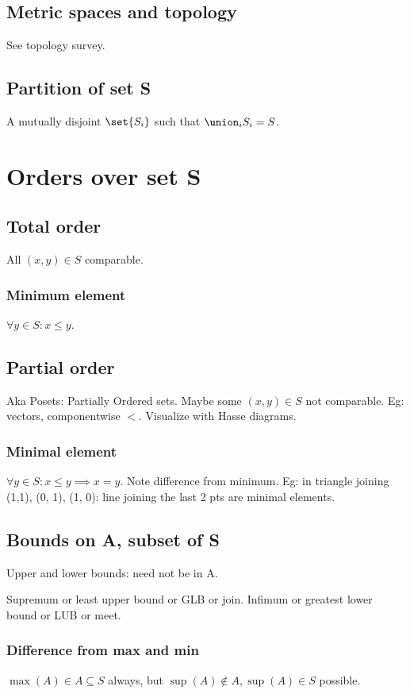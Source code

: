 \documentclass[oneside, article]{memoir}
\begin{document}
\section{Metric spaces and topology}
See topology survey.

\section{Partition of set S}
A mutually disjoint $\set{S_i}$ such that $\union_i S_i = S$.

\chapter{Orders over set S}
\section{Total order}
All $(x, y) \in S$ comparable.

\subsection{Minimum element}
$\forall y \in S: x\leq y$.

\section{Partial order}
Aka Posets: Partially Ordered sets. Maybe some $(x, y) \in S$ not comparable. Eg: vectors, componentwise $<$. Visualize with Hasse diagrams.

\subsection{Minimal element}
$\forall y \in S: x\leq y \implies x = y$. Note difference from minimum. Eg: in triangle joining (1,1), (0, 1), (1, 0): line joining the last 2 pts are minimal elements.


\section{Bounds on A, subset of S}
Upper and lower bounds: need not be in A.

Supremum or least upper bound or GLB or join. Infimum or greatest lower bound or LUB or meet.

\subsection{Difference from max and min}
$\max(A) \in A \subseteq S$ always, but $\sup(A) \notin A, \sup(A) \in S$ possible.
\end{document}
